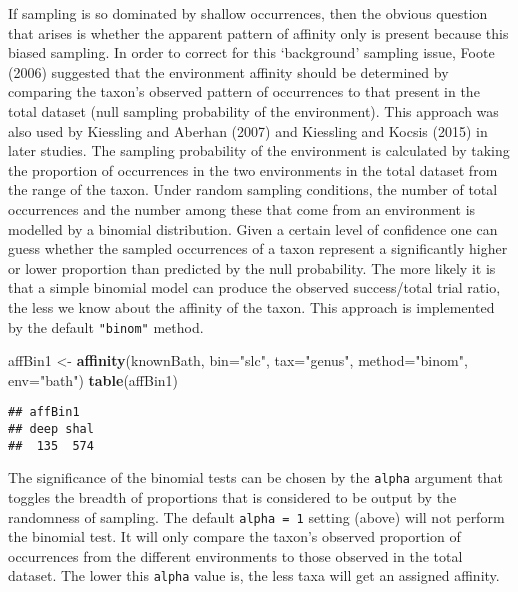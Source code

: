 \documentclass[]{article}
\newenvironment{Shaded}{\begin{snugshade}}{\end{snugshade}}
\newcommand{\DataTypeTok}[1]{\textcolor[rgb]{0.13,0.29,0.53}{#1}}
\newcommand{\KeywordTok}[1]{\textcolor[rgb]{0.13,0.29,0.53}{\textbf{#1}}}
\newcommand{\NormalTok}[1]{#1}
\newcommand{\StringTok}[1]{\textcolor[rgb]{0.31,0.60,0.02}{#1}}
\begin{document}
If sampling is so dominated by shallow occurrences, then the obvious
question that arises is whether the apparent pattern of affinity only is
present because this biased sampling. In order to correct for this
`background' sampling issue, Foote (2006) suggested that the environment
affinity should be determined by comparing the taxon's observed pattern
of occurrences to that present in the total dataset (null sampling
probability of the environment). This approach was also used by
Kiessling and Aberhan (2007) and Kiessling and Kocsis (2015) in later
studies. The sampling probability of the environment is calculated by
taking the proportion of occurrences in the two environments in the
total dataset from the range of the taxon. Under random sampling
conditions, the number of total occurrences and the number among these
that come from an environment is modelled by a binomial distribution.
Given a certain level of confidence one can guess whether the sampled
occurrences of a taxon represent a significantly higher or lower
proportion than predicted by the null probability. The more likely it is
that a simple binomial model can produce the observed success/total
trial ratio, the less we know about the affinity of the taxon. This
approach is implemented by the default \texttt{"binom"} method.

\begin{Shaded}
\begin{Highlighting}[]
\NormalTok{affBin1 <-}\StringTok{ }\KeywordTok{affinity}\NormalTok{(knownBath, }\DataTypeTok{bin=}\StringTok{"slc"}\NormalTok{, }\DataTypeTok{tax=}\StringTok{"genus"}\NormalTok{, }
  \DataTypeTok{method=}\StringTok{"binom"}\NormalTok{, }\DataTypeTok{env=}\StringTok{"bath"}\NormalTok{)}
\KeywordTok{table}\NormalTok{(affBin1)}
\end{Highlighting}
\end{Shaded}

\begin{verbatim}
## affBin1
## deep shal 
##  135  574
\end{verbatim}

The significance of the binomial tests can be chosen by the
\texttt{alpha} argument that toggles the breadth of proportions that is
considered to be output by the randomness of sampling. The default
\texttt{alpha\ =\ 1} setting (above) will not perform the binomial test.
It will only compare the taxon's observed proportion of occurrences from
the different environments to those observed in the total dataset. The
lower this \texttt{alpha} value is, the less taxa will get an assigned
affinity.
\end{document}
